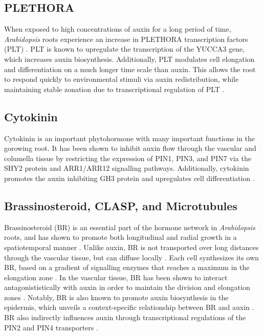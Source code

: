\subsection{PLETHORA}

When exposed to high concentrations of auxin for a long period of time, \emph{Arabidopsis} roots experience an increase in PLETHORA transcription factors (PLT) \cite{mahonen2014}. PLT is known to upregulate the transcription of the YUCCA3 gene, which increases auxin biosynthesis. Additionally, PLT modulates cell elongation and differentiation on a much longer time scale than auxin. This allows the root to respond quickly to environmental stimuli via auxin redistribution, while maintaining stable zonation due to transcriptional regulation of PLT \cite{mahonen2014}. 

\subsection{Cytokinin}

Cytokinin is an important phytohormone with many important functions in the gorowing root. It has been shown to inhibit auxin flow through the vascular and columella tissue by restricting the expression of PIN1, PIN3, and PIN7 \cite{Ioio2008} via the SHY2 protein and ARR1/ARR12 signalling pathways. Additionally, cytokinin promotes the auxin inhibiting GH3 protein \cite{dimambro2017} and upregulates cell differentiation \cite{Ioio2008}. 

\subsection{Brassinosteroid, CLASP, and Microtubules}


Brassinosteroid (BR) is an essential part of the hormone network in \emph{Arabidopsis} roots, and has shown to promote both longitudinal and radial growth in a spatiotemporal manner \cite{ackerman-lavert2020}. Unlike auxin, BR is not transported over long distances through the vascular tissue, but can diffuse locally \cite{vukasinovic2021}. Each cell synthesizes its own BR, based on a gradient of signalling enzymes that reaches a maximum in the elongation zone \cite{vukasinovic2021}.  In the vascular tissue, BR has been shown to interact antagonististically with auxin in order to maintain the division and elongation zones \cite{chaiwanon2015}. Notably, BR is also known to promote auxin biosynthesis in the epidermis, which unveils a context-specific relationship between BR and auxin \cite{vragovic2015}. BR also indirectly influences auxin through transcriptional regulations of the PIN2 and PIN4 transporters \cite{hacham2012}.

